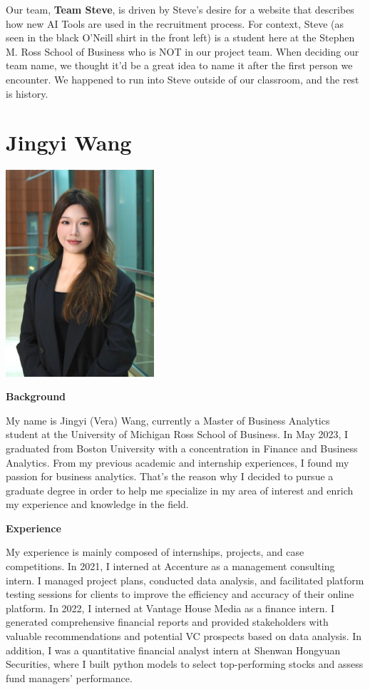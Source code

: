 \documentclass[
]{book}
\begin{document}
Our team, \textbf{Team Steve}, is driven by Steve's desire for a website that describes how new AI Tools are used in the recruitment process. For context, Steve (as seen in the black O'Neill shirt in the front left) is a student here at the Stephen M. Ross School of Business who is NOT in our project team. When deciding our team name, we thought it'd be a great idea to name it after the first person we encounter. We happened to run into Steve outside of our classroom, and the rest is history.

\hypertarget{jingyi-wang}{%
\section{Jingyi Wang}\label{jingyi-wang}}

\includegraphics[width=2.16667in,height=\textheight]{Vera Photo.png}

\textbf{Background}

My name is Jingyi (Vera) Wang, currently a Master of Business Analytics student at the University of Michigan Ross School of Business. In May 2023, I graduated from Boston University with a concentration in Finance and Business Analytics. From my previous academic and internship experiences, I found my passion for business analytics. That's the reason why I decided to pursue a graduate degree in order to help me specialize in my area of interest and enrich my experience and knowledge in the field.

\textbf{Experience}

My experience is mainly composed of internships, projects, and case competitions. In 2021, I interned at Accenture as a management consulting intern. I managed project plans, conducted data analysis, and facilitated platform testing sessions for clients to improve the efficiency and accuracy of their online platform. In 2022, I interned at Vantage House Media as a finance intern. I generated comprehensive financial reports and provided stakeholders with valuable recommendations and potential VC prospects based on data analysis. In addition, I was a quantitative financial analyst intern at Shenwan Hongyuan Securities, where I built python models to select top-performing stocks and assess fund managers' performance.~
\end{document}
